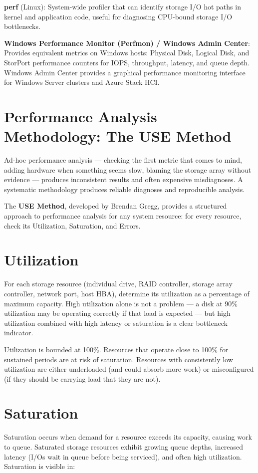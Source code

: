 \textbf{perf} (Linux): System-wide profiler that can identify storage I/O hot paths in kernel and application code, useful for diagnosing CPU-bound storage I/O bottlenecks.

\textbf{Windows Performance Monitor (Perfmon) / Windows Admin Center}: Provides equivalent metrics on Windows hosts: Physical Disk, Logical Disk, and StorPort performance counters for IOPS, throughput, latency, and queue depth. Windows Admin Center provides a graphical performance monitoring interface for Windows Server clusters and Azure Stack HCI.

\section{Performance Analysis Methodology: The USE Method}
Ad-hoc performance analysis --- checking the first metric that comes to mind, adding hardware when something seems slow, blaming the storage array without evidence --- produces inconsistent results and often expensive misdiagnoses. A systematic methodology produces reliable diagnoses and reproducible analysis.

The \textbf{USE Method}, developed by Brendan Gregg, provides a structured approach to performance analysis for any system resource: for every resource, check its Utilization, Saturation, and Errors.

\section{Utilization}
For each storage resource (individual drive, RAID controller, storage array controller, network port, host HBA), determine its utilization as a percentage of maximum capacity. High utilization alone is not a problem --- a disk at 90\% utilization may be operating correctly if that load is expected --- but high utilization combined with high latency or saturation is a clear bottleneck indicator.

Utilization is bounded at 100\%. Resources that operate close to 100\% for sustained periods are at risk of saturation. Resources with consistently low utilization are either underloaded (and could absorb more work) or misconfigured (if they should be carrying load that they are not).

\section{Saturation}
Saturation occurs when demand for a resource exceeds its capacity, causing work to queue. Saturated storage resources exhibit growing queue depths, increased latency (I/Os wait in queue before being serviced), and often high utilization. Saturation is visible in:

